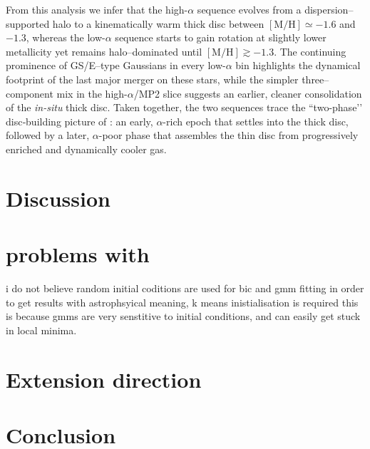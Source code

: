 \documentclass[a4paper,12pt]{article}
\begin{document}
 
From this analysis we infer that the high-$\alpha$ sequence evolves from a dispersion–supported 
halo to a kinematically warm thick disc between $[\mathrm{M/H}]\simeq-1.6$ and $-1.3$, whereas 
the low-$\alpha$ sequence starts to gain rotation at slightly lower metallicity yet remains 
halo–dominated until $[\mathrm{M/H}]\gtrsim-1.3$.  
The continuing prominence of GS/E–type Gaussians in every low-$\alpha$ bin highlights the dynamical 
footprint of the last major merger on these stars, while the simpler three–component 
mix in the high-$\alpha$/MP2 slice suggests an earlier, cleaner consolidation of the \textit{in-situ} thick disc.  
Taken together, the two sequences trace the “two-phase’’ disc‐building picture of \citet{Haywood2013}: 
an early, $\alpha$-rich epoch that settles into the thick disc, followed by a later, 
$\alpha$-poor phase that assembles the thin disc from progressively 
enriched and dynamically cooler gas.



\section{Discussion} \label{sec:discussion}







\section{problems with \citet{zhang2024existencemetalpoordiscmilky}}

i do not believe random initial coditions are used for bic and gmm fitting
in order to get results with astrophsyical meaning, k means inistialisation is required
this is because gmms are very senstitive to initial conditions, and can easily get stuck in local minima.

\section{Extension direction}

\section{Conclusion}



\newpage


\end{document}
